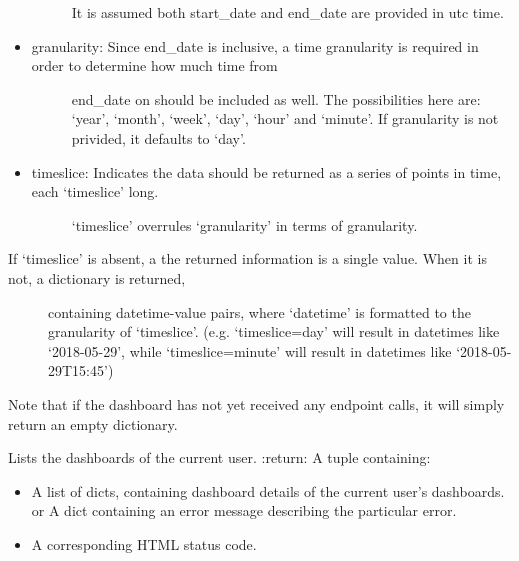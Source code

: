 \documentclass[letterpaper,10pt,english]{sphinxmanual}
\begin{document}
\begin{fulllineitems}
\begin{itemize}
\begin{description}
It is assumed both start\_date and end\_date are provided in utc time.

\end{description}

\item {} \begin{description}
\item[{granularity: Since end\_date is inclusive, a time granularity is required in order to determine how much time from}] \leavevmode
end\_date on should be included as well. The possibilities here are: ‘year’, ‘month’, ‘week’, ‘day’, ‘hour’ and ‘minute’.
If granularity is not privided, it defaults to ‘day’.

\end{description}

\item {} \begin{description}
\item[{timeslice: Indicates the data should be returned as a series of points in time, each ‘timeslice’ long.}] \leavevmode
‘timeslice’ overrules ‘granularity’ in terms of granularity.

\end{description}

\end{itemize}
\begin{description}
\item[{If ‘timeslice’ is absent, a the returned information is a single value. When it is not, a dictionary is returned,}] \leavevmode
containing datetime-value pairs, where ‘datetime’ is formatted to the granularity of ‘timeslice’.
(e.g. ‘timeslice=day’ will result in datetimes like ‘2018-05-29’, while ‘timeslice=minute’ will result in
datetimes like ‘2018-05-29T15:45’)

\end{description}

Note that if the dashboard has not yet received any endpoint calls, it will simply return an empty dictionary.

\end{fulllineitems}


\begin{fulllineitems}
\label{\detokenize{pydash_web.controller.dashboards:pydash_web.controller.dashboards.dashboards}}
Lists the dashboards of the current user.
:return: A tuple containing:
\begin{itemize}
\item {} 
A list of dicts, containing dashboard details of the current user’s dashboards.
or
A dict containing an error message describing the particular error.

\item {} 
A corresponding HTML status code.

\end{itemize}

\end{fulllineitems}
\end{document}
